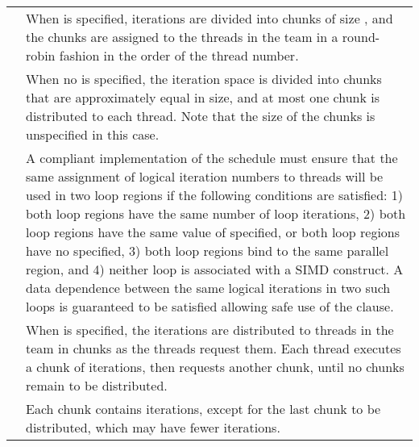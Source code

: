 \vspace{1ex}\renewcommand{\arraystretch}{1.5}
\tablefirsthead{%
\hline\\[-3ex]
}
\tablelasttail{\hline}
\begin{supertabular}{ p{0.8in} p{4.3in} }
 & When  is specified, iterations are divided 
into chunks of size , and the chunks are assigned to the threads in 
the team in a round-robin fashion in the order of the thread number.\\

 & When no  is specified, the iteration space is divided into chunks that 
are approximately equal in size, and at most one chunk is distributed to each 
thread. Note that the size of the chunks is unspecified in this case.\\

 & A compliant implementation of the  schedule must ensure that the 
same assignment of logical iteration numbers to threads will be used in two 
loop regions if the following conditions are satisfied: 1) both loop regions have 
the same number of loop iterations, 2) both loop regions have the same value 
of  specified, or both loop regions have no  specified, 3) 
both loop regions bind to the same parallel region, and 4) neither loop is 
associated with a SIMD construct. A data dependence between the same 
logical iterations in two such loops is guaranteed to be satisfied allowing safe 
use of the  clause.\\

 & When  is specified, the iterations are
distributed to threads in the team in chunks as the threads request them. Each 
thread executes a chunk of iterations, then requests another chunk, until no 
chunks remain to be distributed.\\

 & Each chunk contains  iterations, except for the last chunk to be 
distributed, which may have fewer iterations.\\


\end{supertabular}
